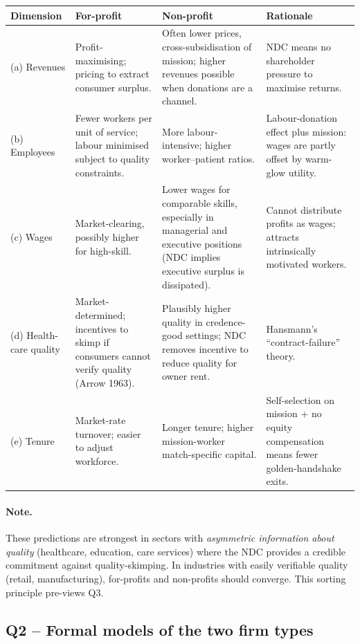\documentclass[11pt,a4paper]{article}
\begin{document}
\begin{center}
\small
\begin{tabular}{p{2.5cm} p{3.0cm} p{3.0cm} p{5.6cm}}
\toprule
Dimension & For-profit & Non-profit & Rationale \\
\midrule
(a) Revenues & Profit-maximising; pricing to extract consumer surplus. & Often lower prices, cross-subsidisation of mission; higher revenues possible when donations are a channel. & NDC means no shareholder pressure to maximise returns. \\
(b) Employees & Fewer workers per unit of service; labour minimised subject to quality constraints. & More labour-intensive; higher worker--patient ratios. & Labour-donation effect plus mission: wages are partly offset by warm-glow utility. \\
(c) Wages & Market-clearing, possibly higher for high-skill. & Lower wages for comparable skills, especially in managerial and executive positions (NDC implies executive surplus is dissipated). & Cannot distribute profits as wages; attracts intrinsically motivated workers. \\
(d) Health-care quality & Market-determined; incentives to skimp if consumers cannot verify quality (Arrow 1963). & Plausibly higher quality in credence-good settings; NDC removes incentive to reduce quality for owner rent. & Hansmann's ``contract-failure'' theory. \\
(e) Tenure & Market-rate turnover; easier to adjust workforce. & Longer tenure; higher mission-worker match-specific capital. & Self-selection on mission + no equity compensation means fewer golden-handshake exits. \\
\bottomrule
\end{tabular}
\end{center}

\paragraph{Note.}
These predictions are strongest in sectors with \emph{asymmetric information about quality} (healthcare, education, care services) where the NDC provides a credible commitment against quality-skimping. In industries with easily verifiable quality (retail, manufacturing), for-profits and non-profits should converge. This sorting principle pre-views Q3.

\subsection*{Q2 -- Formal models of the two firm types}
\end{document}
